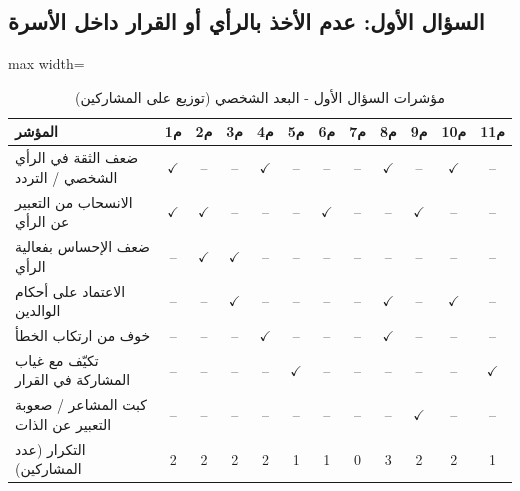 \documentclass[12pt,oneside]{report}
\begin{document}
\subsection{السؤال الأول: عدم الأخذ بالرأي أو القرار داخل الأسرة}
\begin{table}[H]
\centering
\caption{مؤشرات السؤال الأول - البعد الشخصي (توزيع على المشاركين)}
\scriptsize
\renewcommand{\arraystretch}{1.3}
\setlength{\tabcolsep}{4pt}
\begin{adjustbox}{max width=\textwidth}
\begin{tabular}{l c c c c c c c c c c c}
\toprule
\textbf{المؤشر} & \textbf{م1} & \textbf{م2} & \textbf{م3} & \textbf{م4} & \textbf{م5} & \textbf{م6} & \textbf{م7} & \textbf{م8} & \textbf{م9} & \textbf{م10} & \textbf{م11} \\
\midrule
ضعف الثقة في الرأي الشخصي / التردد & $\checkmark$ & -- & -- & $\checkmark$ & -- & -- & -- & $\checkmark$ & -- & $\checkmark$ & -- \\
الانسحاب من التعبير عن الرأي & $\checkmark$ & $\checkmark$ & -- & -- & -- & $\checkmark$ & -- & -- & $\checkmark$ & -- & -- \\
ضعف الإحساس بفعالية الرأي & -- & $\checkmark$ & $\checkmark$ & -- & -- & -- & -- & -- & -- & -- & -- \\
الاعتماد على أحكام الوالدين & -- & -- & $\checkmark$ & -- & -- & -- & -- & $\checkmark$ & -- & $\checkmark$ & -- \\
خوف من ارتكاب الخطأ & -- & -- & -- & $\checkmark$ & -- & -- & -- & $\checkmark$ & -- & -- & -- \\
تكيّف مع غياب المشاركة في القرار & -- & -- & -- & -- & $\checkmark$ & -- & -- & -- & -- & -- & $\checkmark$ \\
كبت المشاعر / صعوبة التعبير عن الذات & -- & -- & -- & -- & -- & -- & -- & -- & $\checkmark$ & -- & -- \\
التكرار (عدد المشاركين) & 2 & 2 & 2 & 2 & 1 & 1 & 0 & 3 & 2 & 2 & 1 \\
\bottomrule
\end{tabular}
\end{adjustbox}
\end{table}
\end{document}
